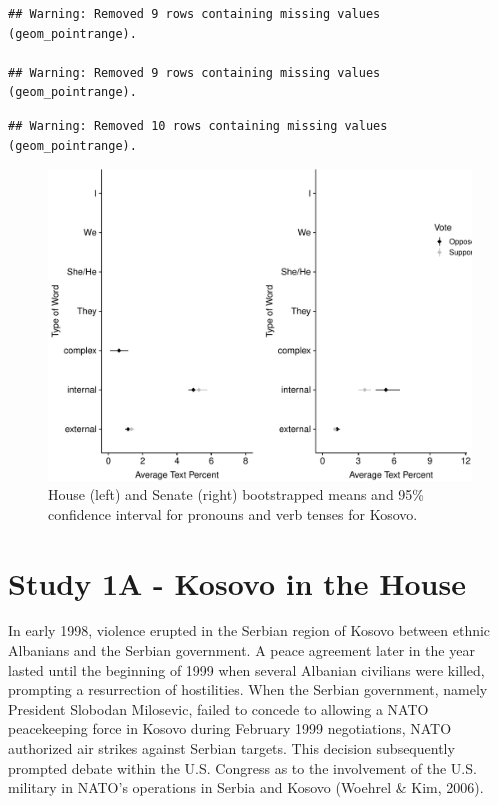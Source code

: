 \documentclass[english,,man]{apa6}
\begin{document}
\begin{verbatim}
## Warning: Removed 9 rows containing missing values (geom_pointrange).

## Warning: Removed 9 rows containing missing values (geom_pointrange).
\end{verbatim}

\begin{verbatim}
## Warning: Removed 10 rows containing missing values (geom_pointrange).
\end{verbatim}

\begin{figure}
\centering
\includegraphics{Language_of_War_Markdown_KJ2_files/figure-latex/Kpic-1.pdf}
\caption{\label{fig:Kpic}House (left) and Senate (right) bootstrapped means and 95\% confidence interval for pronouns and verb tenses for Kosovo.}
\end{figure}

\hypertarget{study-1a---kosovo-in-the-house}{%
\section{Study 1A - Kosovo in the House}\label{study-1a---kosovo-in-the-house}}

In early 1998, violence erupted in the Serbian region of Kosovo between ethnic Albanians and the Serbian government. A peace agreement later in the year lasted until the beginning of 1999 when several Albanian civilians were killed, prompting a resurrection of hostilities. When the Serbian government, namely President Slobodan Milosevic, failed to concede to allowing a NATO peacekeeping force in Kosovo during February 1999 negotiations, NATO authorized air strikes against Serbian targets. This decision subsequently prompted debate within the U.S. Congress as to the involvement of the U.S. military in NATO's operations in Serbia and Kosovo (Woehrel \& Kim, 2006).
\end{document}
